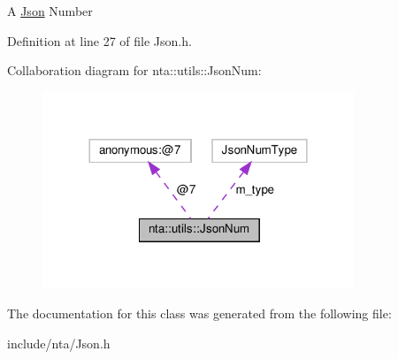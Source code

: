 A \hyperlink{classnta_1_1utils_1_1Json}{Json} Number 

Definition at line 27 of file Json.\+h.



Collaboration diagram for nta\+:\+:utils\+:\+:Json\+Num\+:\nopagebreak
\begin{figure}[H]
\begin{center}
\leavevmode
\includegraphics[width=264pt]{d6/d43/classnta_1_1utils_1_1JsonNum__coll__graph}
\end{center}
\end{figure}


The documentation for this class was generated from the following file\+:\begin{DoxyCompactItemize}
\item 
include/nta/Json.\+h\end{DoxyCompactItemize}
